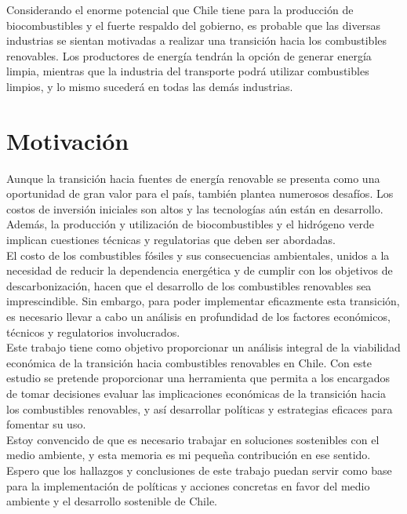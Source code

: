 Considerando el enorme potencial que Chile tiene para la producción de biocombustibles y el fuerte respaldo del gobierno, es probable que las diversas industrias se sientan motivadas a realizar una transición hacia los combustibles renovables. Los productores de energía tendrán la opción de generar energía limpia, mientras que la industria del transporte podrá utilizar combustibles limpios, y lo mismo sucederá en todas las demás industrias.\\

\section{Motivación}
Aunque la transición hacia fuentes de energía renovable se presenta como una oportunidad de gran valor para el país, también plantea numerosos desafíos. Los costos de inversión iniciales son altos y las tecnologías aún están en desarrollo. Además, la producción y utilización de biocombustibles y el hidrógeno verde implican cuestiones técnicas y regulatorias que deben ser abordadas.\\

El costo de los combustibles fósiles y sus consecuencias ambientales, unidos a la necesidad de reducir la dependencia energética y de cumplir con los objetivos de descarbonización, hacen que el desarrollo de los combustibles renovables sea imprescindible. Sin embargo, para poder implementar eficazmente esta transición, es necesario llevar a cabo un análisis en profundidad de los factores económicos, técnicos y regulatorios involucrados.\\

Este trabajo tiene como objetivo proporcionar un análisis integral de la viabilidad económica de la transición hacia combustibles renovables en Chile. Con este estudio se pretende proporcionar una herramienta que permita a los encargados de tomar decisiones evaluar las implicaciones económicas de la transición hacia los combustibles renovables, y así desarrollar políticas y estrategias eficaces para fomentar su uso.\\

Estoy convencido de que es necesario trabajar en soluciones sostenibles con el medio ambiente, y esta memoria es mi pequeña contribución en ese sentido. Espero que los hallazgos y conclusiones de este trabajo puedan servir como base para la implementación de políticas y acciones concretas en favor del medio ambiente y el desarrollo sostenible de Chile.\\


